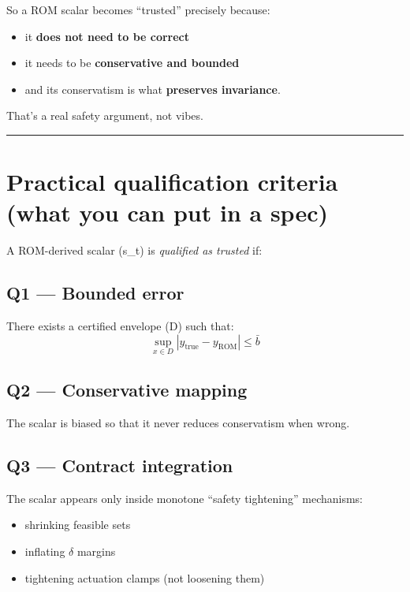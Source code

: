 \documentclass[11pt,a4paper]{article}
\begin{document}
So a ROM scalar becomes ``trusted'' precisely because:

\begin{itemize}
\item it \textbf{does not need to be correct}
\item it needs to be \textbf{conservative and bounded}
\item and its conservatism is what \textbf{preserves invariance}.
\end{itemize}

That’s a real safety argument, not vibes.

\hrule
\vspace{0.75em}

\section{Practical qualification criteria (what you can put in a spec)}

A ROM-derived scalar (s\_t) is \textit{qualified as trusted} if:

\subsection*{\textbf{Q1 — Bounded error}}

There exists a certified envelope (D) such that:
\[
\sup_{x\in D}|y_{\text{true}}-y_{\text{ROM}}|\le \bar b
\]

\subsection*{\textbf{Q2 — Conservative mapping}}

The scalar is biased so that it never reduces conservatism when wrong.

\subsection*{\textbf{Q3 — Contract integration}}

The scalar appears only inside monotone ``safety tightening'' mechanisms:

\begin{itemize}
\item shrinking feasible sets
\item inflating $\delta$ margins
\item tightening actuation clamps
  (not loosening them)
\end{itemize}
\end{document}
